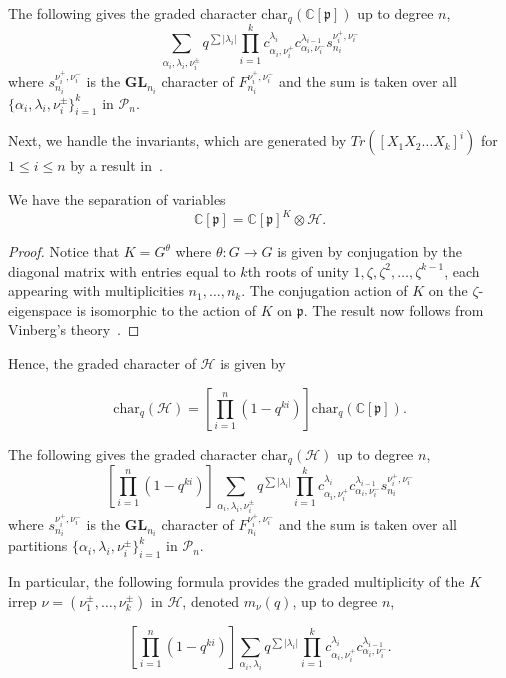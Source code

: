 \documentclass[ALCO,Unicode]{cedram}
\newcommand{\C}{\mathbb{C}}
\newcommand{\Ha}{\mathcal{H}}
\newcommand{\p}{\mathfrak{p}}
\newcommand{\chr}{\text{char}}
\newcommand{\GL}{\textbf{GL}}
\newcommand{\Par}{\mathcal{P}}
\begin{document}
\begin{cor}
    The following gives the graded character $\chr_q(\C[\p])$ up to degree $n$,
    $$\sum_{\alpha_i, \lambda_i, \nu_i^\pm} q^{\sum |\lambda_i|}\prod_{i=1}^k
    c^{\lambda_i}_{\alpha_i, \nu_i^+} c^{\lambda_{i-1}}_{\alpha_i, \nu_i^-} 
    s^{\nu_i^+, \nu_i^-}_{n_i}$$
where $s^{\nu_i^+, \nu_i^-}_{n_i}$ is the $\GL_{n_i}$ character of $F^{\nu_i^+, \nu_i^-}_{n_i}$ and the sum is taken over all $\{\alpha_i, \lambda_i, \nu_i^\pm\}_{i=1}^k$ in $\Par_n$.
    
\end{cor}

Next, we handle the invariants, which are generated by $Tr([X_1 X_2 \dots X_k]^i)$ for $1 \leq i \leq n$ by a result in~\cite{LeBryunProcesi1990}.
\begin{prop}
    We have the separation of variables
    \begin{equation*}
        \C[\p] = \C[\p]^K \otimes \Ha.
    \end{equation*}
\end{prop}
\begin{proof}
    Notice that $K = G^\theta$ where $\theta:G \to G$ is given by conjugation by the diagonal matrix with entries equal to $k$th roots of unity $1,\zeta,\zeta^2,\dots,\zeta^{k-1}$, each appearing with multiplicities $n_1,\dots,n_k$. The conjugation action of $K$ on the $\zeta$-eigenspace is isomorphic to the action of $K$ on $\p$. The result now follows from Vinberg's theory~\cite{Vinberg1976}.
\end{proof}
 
Hence, the graded character of $\Ha$ is given by

$$\chr_q(\Ha) = [\prod_{i=1}^n(1-q^{ki})]\chr_q(\C[\p]).$$

\begin{cor} \label{cor-gradedHchar}
    The following gives the graded character $\chr_q(\Ha)$ up to degree $n$,
    $$[\prod_{i=1}^n(1-q^{ki})]\sum_{\alpha_i, \lambda_i, \nu_i^\pm} q^{\sum |\lambda_i|}\prod_{i=1}^k
    c^{\lambda_i}_{\alpha_i, \nu_i^+} c^{\lambda_{i-1}}_{\alpha_i, \nu_i^-} 
    s^{\nu_i^+, \nu_i^-}_{n_i}$$
 where $s^{\nu_i^+, \nu_i^-}_{n_i}$ is the $\GL_{n_i}$ character of $F^{\nu_i^+, \nu_i^-}_{n_i}$ and the sum is taken over all partitions $\{\alpha_i, \lambda_i, \nu_i^\pm\}_{i=1}^k$ in $\Par_n$.

    In particular, the following formula provides the graded multiplicity of the $K$ irrep $\nu = (\nu_1^\pm, \dots , \nu_k^\pm)$ in $\Ha$, denoted $m_{\nu}(q)$, up to degree $n$,

    $$[\prod_{i=1}^n(1-q^{ki})]\sum_{\alpha_i, \lambda_i} q^{\sum |\lambda_i|}\prod_{i=1}^k
    c^{\lambda_i}_{\alpha_i, \nu_i^+} c^{\lambda_{i-1}}_{\alpha_i, \nu_i^-}.$$
\end{cor}
\end{document}
